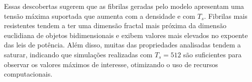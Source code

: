 \documentclass{article}
\begin{document}
    Essas descobertas sugerem que as fibrilas geradas pelo modelo apresentam uma tensão máxima suportada que aumenta com a 
    densidade e com \(T_{s}\). Fibrilas mais resistentes tendem a ter uma dimensão fractal mais próxima da dimensão 
    euclidiana de objetos bidimensionais e exibem valores mais elevados no expoente das leis de potência. Além disso, muitas 
    das propriedades analisadas tendem a saturar, indicando que simulações realizadas com \(T_{s} = 512\) são suficientes para 
    observar os valores máximos de interesse, otimizando o uso de recursos computacionais.








    
\end{document}
